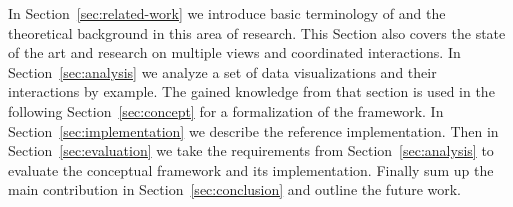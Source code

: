 In Section~\ref{sec:related-work} we introduce basic terminology of \cmvs{} and the theoretical background in this area of research.
This Section also covers the state of the art and research on multiple views and coordinated interactions.
In Section~\ref{sec:analysis} we analyze a set of data visualizations and their interactions by example.
The gained knowledge from that section is used in the following Section~\ref{sec:concept} for a formalization of the \cmv{} framework.
In Section~\ref{sec:implementation} we describe the reference implementation.
Then in Section~\ref{sec:evaluation} we take the requirements from Section~\ref{sec:analysis} to evaluate the conceptual framework and its implementation.
Finally sum up the main contribution in Section~\ref{sec:conclusion} and outline the future work.


